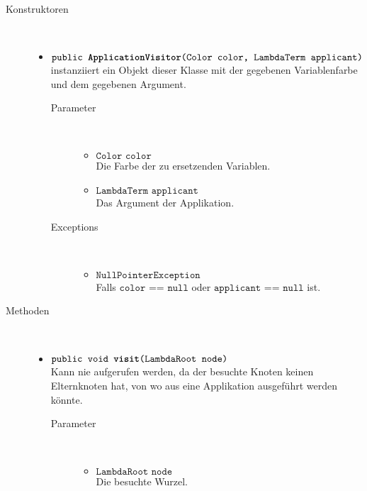 \begin{description}
\item[Konstruktoren] \hfill \\
	\vspace{-.8cm}
	\begin{itemize}
		\item $\texttt{public \textbf{ApplicationVisitor}(Color color, LambdaTerm applicant)}$ \\ instanziiert ein Objekt dieser Klasse mit der gegebenen Variablenfarbe und dem gegebenen Argument.
		\begin{description}
			\item[Parameter] \hfill \\
			\vspace{-.8cm}
			\begin{itemize}
				\item $\texttt{Color color}$ \\ Die Farbe der zu ersetzenden Variablen.
				\item $\texttt{LambdaTerm applicant}$ \\ Das Argument der Applikation.
			\end{itemize}
			\item[Exceptions] \hfill \\
			\vspace{-.8cm}
			\begin{itemize}
				\item $\texttt{NullPointerException}$ \\ Falls $\texttt{color == null}$ oder $\texttt{applicant == null}$ ist.
			\end{itemize}
		\end{description}
	\end{itemize}

\item[Methoden] \hfill \\
	\vspace{-.8cm}
	\begin{itemize}
		\item $\texttt{public void \textbf{visit}(LambdaRoot node)}$ \\ Kann nie aufgerufen werden, da der besuchte Knoten keinen Elternknoten hat, von wo aus eine Applikation ausgeführt werden könnte.
		\begin{description}
			\item[Parameter] \hfill \\
			\vspace{-.8cm}
			\begin{itemize}
				\item $\texttt{LambdaRoot node}$ \\ Die besuchte Wurzel.
			\end{itemize}
		\end{description}
				

\end{itemize}
\end{description}
